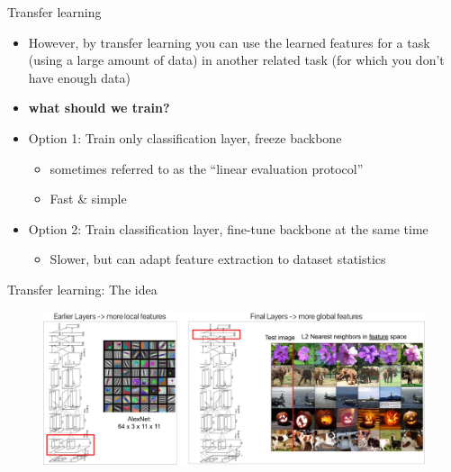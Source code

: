 \documentclass[serif, aspectratio=169]{beamer}
\begin{document}
\begin{frame}{Transfer learning}
	\begin{itemize}
		\item However, by transfer learning you can use the learned features for a task (using a large amount of data) in another related task (for which you don’t have enough data)
		\item \textbf{what should we train?}
		\item Option 1: Train only classification layer, freeze backbone

		\begin{itemize}
			\item sometimes referred to as the “linear evaluation protocol”
			\item Fast \& simple
		\end{itemize}
		\item Option 2: Train classification layer, fine-tune backbone at the same time

		\begin{itemize}
			\item Slower, but can adapt feature extraction to dataset statistics
		\end{itemize}
	\end{itemize}
\end{frame}

\begin{frame}{Transfer learning: The idea}
	\vspace{-1em}
	\begin{figure}[htpb]
		\begin{center}
			\includegraphics[keepaspectratio, scale=0.23]{pic/TL_alexnet}
		\end{center}
	\end{figure}
\end{frame}
\end{document}
